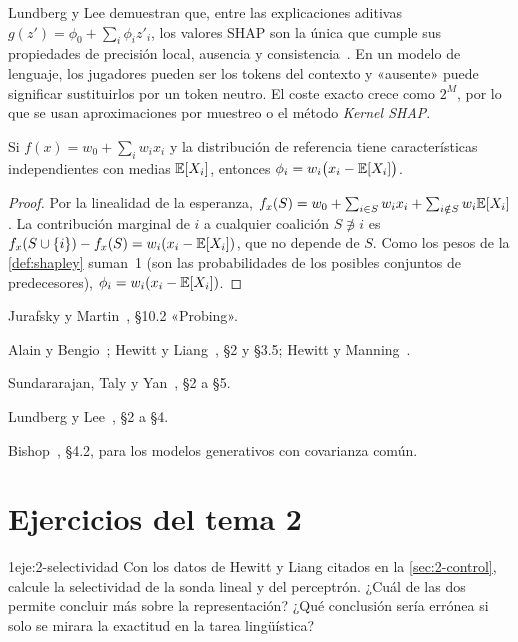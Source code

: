 Lundberg y Lee demuestran que, entre las explicaciones aditivas $g(z')=\phi_0+\sum_i\phi_iz'_i$, los valores SHAP son la única que cumple sus propiedades de precisión local, ausencia y consistencia~\cite[teorema~1]{lundberg}. En un modelo de lenguaje, los jugadores pueden ser los tokens del contexto y «ausente» puede significar sustituirlos por un token neutro. El coste exacto crece como $2^{M}$, por lo que se usan aproximaciones por muestreo o el método \emph{Kernel SHAP}.

\begin{proposicion}\label{prop:shap-lineal}
Si $f(x)=w_0+\sum_iw_ix_i$ y la distribución de referencia tiene características independientes con medias $\mathbb{E}[X_i]$, entonces $\phi_i=w_i\bigl(x_i-\mathbb{E}[X_i]\bigr)$.
\end{proposicion}

\begin{proof}
Por la linealidad de la esperanza, $f_x(S)=w_0+\sum_{i\in S}w_ix_i+\sum_{i\notin S}w_i\mathbb{E}[X_i]$. La contribución marginal de $i$ a cualquier coalición $S\not\ni i$ es $f_x(S\cup\{i\})-f_x(S)=w_i(x_i-\mathbb{E}[X_i])$, que no depende de $S$. Como los pesos de la \cref{def:shapley} suman~1 (son las probabilidades de los posibles conjuntos de predecesores), $\phi_i=w_i(x_i-\mathbb{E}[X_i])$.
\end{proof}

\begin{lecturas}
\item Jurafsky y Martin~\cite{jm3}, §10.2 «Probing».
\item Alain y Bengio~\cite{alain}; Hewitt y Liang~\cite{hewitt-liang}, §2 y §3.5; Hewitt y Manning~\cite{hewitt-manning}.
\item Sundararajan, Taly y Yan~\cite{sundararajan}, §2 a §5.
\item Lundberg y Lee~\cite{lundberg}, §2 a §4.
\item Bishop~\cite{bishop}, §4.2, para los modelos generativos con covarianza común.
\end{lecturas}

\section*{Ejercicios del tema 2}

\begin{ejercicio}{1}{eje:2-selectividad}
Con los datos de Hewitt y Liang citados en la \cref{sec:2-control}, calcule la selectividad de la sonda lineal y del perceptrón. ¿Cuál de las dos permite concluir más sobre la representación? ¿Qué conclusión sería errónea si solo se mirara la exactitud en la tarea lingüística?
\end{ejercicio}

